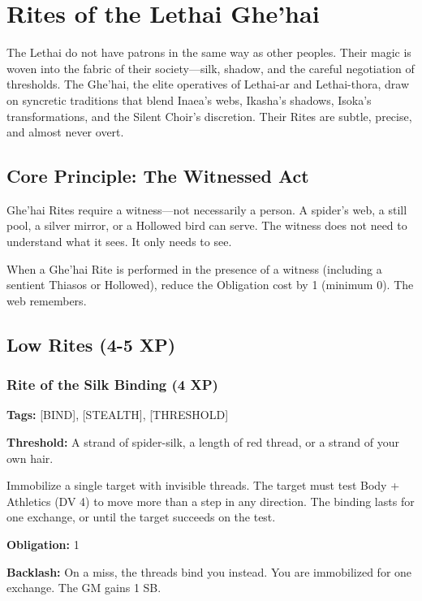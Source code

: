 \section{Rites of the Lethai Ghe'hai}

The Lethai do not have patrons in the same way as other peoples. Their magic is woven into the fabric of their society—silk, shadow, and the careful negotiation of thresholds. The Ghe'hai, the elite operatives of Lethai-ar and Lethai-thora, draw on syncretic traditions that blend Inaea's webs, Ikasha's shadows, Isoka's transformations, and the Silent Choir's discretion. Their Rites are subtle, precise, and almost never overt.

\subsection{Core Principle: The Witnessed Act}

Ghe'hai Rites require a witness—not necessarily a person. A spider's web, a still pool, a silver mirror, or a Hollowed bird can serve. The witness does not need to understand what it sees. It only needs to see.

When a Ghe'hai Rite is performed in the presence of a witness (including a sentient Thiasos or Hollowed), reduce the Obligation cost by 1 (minimum 0). The web remembers.

\subsection{Low Rites (4-5 XP)}

\subsubsection{Rite of the Silk Binding (4 XP)}

\textbf{Tags:} [BIND], [STEALTH], [THRESHOLD]

\textbf{Threshold:} A strand of spider-silk, a length of red thread, or a strand of your own hair.

Immobilize a single target with invisible threads. The target must test Body + Athletics (DV 4) to move more than a step in any direction. The binding lasts for one exchange, or until the target succeeds on the test.

\textbf{Obligation:} 1

\textbf{Backlash:} On a miss, the threads bind you instead. You are immobilized for one exchange. The GM gains 1 SB.

